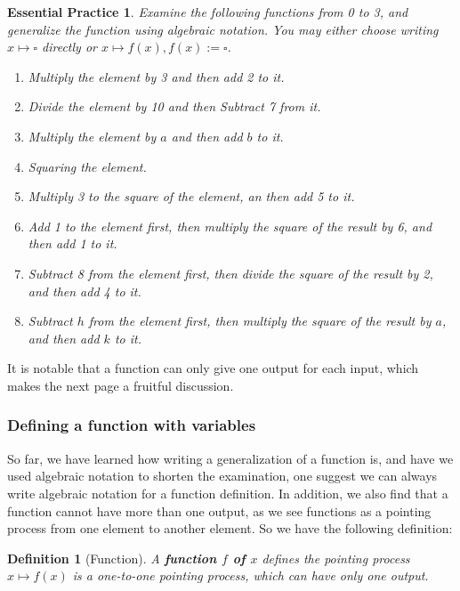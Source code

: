 \documentclass[12pt]{article}
\newtheorem{definition}{Definition}[section]
\newtheorem{exercise}{Essential Practice}[subsubsection]
\begin{document}
    \begin{exercise}
        Examine the following functions from 0 to 3, and generalize the function using algebraic notation. You may either choose writing $x\mapsto \square$ directly or $x\mapsto f(x), f(x):=\square$.\begin{enumerate}
            \item Multiply the element by 3 and then add 2 to it.
            \item Divide the element by 10 and then Subtract 7 from it.
            \item Multiply the element by $a$ and then add $b$ to it.
            \item Squaring the element.
            \item Multiply 3 to the square of the element, an then add 5 to it.
            \item Add 1 to the element first, then multiply the square of the result by 6, and then add 1 to it.
            \item Subtract 8 from the element first, then divide the square of the result by 2, and then add 4 to it.
            \item Subtract $h$ from the element first, then multiply the square of the result by $a$, and then add $k$ to it.
        \end{enumerate}
    \end{exercise}

    It is notable that a function can only give one output for each input, which makes the next page a fruitful discussion.

    \subsubsection{Defining a function with variables}

    So far, we have learned how writing a generalization of a function is, and have we used algebraic notation to shorten the examination, one suggest we can always write algebraic notation for a function definition. In addition, we also find that a function cannot have more than one output, as we see functions as a pointing process from one element to another element. So we have the following definition:

    \begin{definition}[Function]
        A \textbf{function $f$ of $x$} defines the pointing process $x\mapsto f(x)$ is a one-to-one pointing process, which can have only one output.
    \end{definition}
\end{document}

